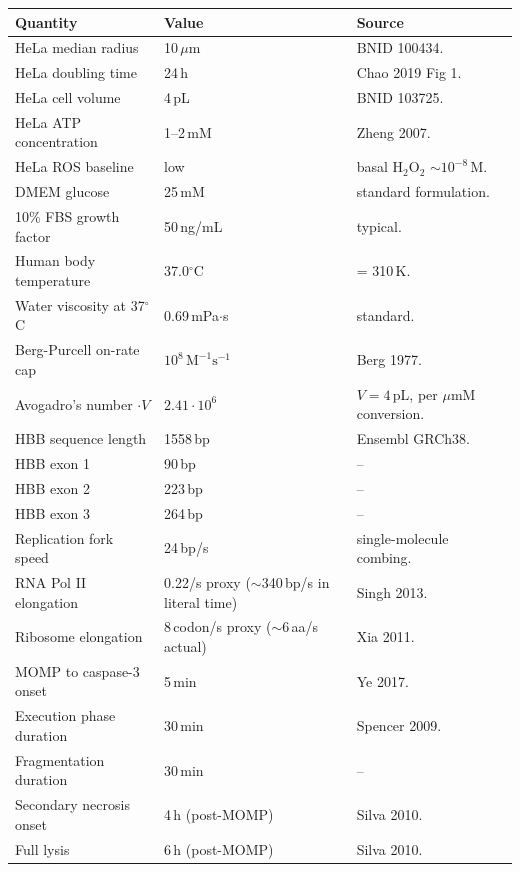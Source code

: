\documentclass[11pt,letterpaper,twoside,openany]{book}
\newcommand{\um}{\ensuremath{\mu\text{m}}}
\begin{document}
\begin{longtable}{p{5.5cm}p{3.5cm}p{5.0cm}}
\toprule
\textbf{Quantity} & \textbf{Value} & \textbf{Source}\\ \midrule
HeLa median radius        & 10\,\um     & BNID 100434.\\
HeLa doubling time        & 24\,h       & Chao 2019 Fig 1.\\
HeLa cell volume          & 4\,pL        & BNID 103725.\\
HeLa ATP concentration    & 1--2\,mM    & Zheng 2007.\\
HeLa ROS baseline         & low         & basal H$_2$O$_2$ $\sim 10^{-8}$\,M.\\
DMEM glucose              & 25\,mM      & standard formulation.\\
10\% FBS growth factor    & 50\,ng/mL   & typical.\\
Human body temperature    & 37.0$^\circ$C & = 310\,K.\\
Water viscosity at 37$^\circ$C & 0.69\,mPa$\cdot$s & standard.\\
Berg-Purcell on-rate cap  & $10^8\,\text{M}^{-1}\text{s}^{-1}$ & Berg 1977.\\
Avogadro's number $\cdot V$ & $2.41 \cdot 10^6$ & $V = 4$\,pL, per \um M conversion.\\
HBB sequence length       & 1558\,bp    & Ensembl GRCh38.\\
HBB exon 1                & 90\,bp       & --\\
HBB exon 2                & 223\,bp     & --\\
HBB exon 3                & 264\,bp     & --\\
Replication fork speed    & 24\,bp/s    & single-molecule combing.\\
RNA Pol II elongation     & 0.22/s proxy ($\sim$340\,bp/s in literal time) & Singh 2013.\\
Ribosome elongation       & 8\,codon/s proxy ($\sim$6\,aa/s actual) & Xia 2011.\\
MOMP to caspase-3 onset   & 5\,min       & Ye 2017.\\
Execution phase duration  & 30\,min      & Spencer 2009.\\
Fragmentation duration    & 30\,min      & --\\
Secondary necrosis onset  & 4\,h (post-MOMP) & Silva 2010.\\
Full lysis                & 6\,h (post-MOMP) & Silva 2010.\\
\bottomrule
\end{longtable}
\end{document}
